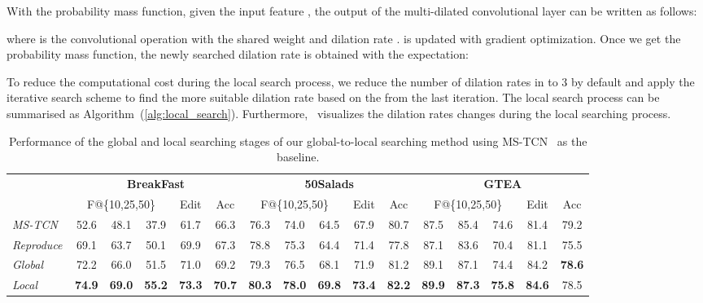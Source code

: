 \documentclass[final]{cvpr}
\renewcommand{\algref}[1]{Algorithm~(\ref{#1})}
\newcommand{\tbf}[1]{\textbf{#1}}
\begin{document}
With the probability mass function, given the input feature ,
the output  of the multi-dilated convolutional layer can be written 
as follows:

where  is the convolutional operation 
with the shared weight  and dilation rate .
 is updated with gradient optimization.
Once we get the probability mass function,
the newly searched dilation rate  is obtained with the expectation:

To reduce the computational cost during the local search process, 
we reduce the number of dilation rates in  to 3 by default
and apply the iterative search scheme to find the more suitable dilation rate 
based on the   from the last iteration.
The local search process can be summarised as \algref{alg:local_search}.
Furthermore,~ visualizes the dilation rates 
changes during the local searching process.

\def\fMeaures{\multicolumn{3}{c}{F@\{10,25,50\}}}

\begin{table*}[t]
  \small
  \centering 
  \setlength{\tabcolsep}{2.23mm}
  \begin{tabular}{lccccc|ccccc|ccccc}
    \toprule & \multicolumn{5}{c|}{\tbf{BreakFast}} &  
    \multicolumn{5}{c|}{\tbf{50Salads}} &
    \multicolumn{5}{c}{\tbf{GTEA}} 
    \\
    & \fMeaures & Edit & Acc & \fMeaures & Edit & Acc & \fMeaures & Edit & Acc
    \\ \Xhline{0.8pt}
    \textsl{MS-TCN~\cite{farha2019ms}}
    & 52.6 & 48.1 & 37.9 & 61.7 & 66.3
    & 76.3 & 74.0 & 64.5 & 67.9 & 80.7
    & 87.5 & 85.4 & 74.6 & 81.4 & 79.2
    \\
    \textsl{Reproduce}
    & 69.1 & 63.7 & 50.1 & 69.9 & 67.3
    & 78.8 & 75.3 & 64.4 & 71.4 & 77.8
    & 87.1 & 83.6 & 70.4 & 81.1 & 75.5
    \\ \hline
    \textsl{Global}
    & 72.2 & 66.0 & 51.5 & 71.0 & 69.2
    & 79.3 & 76.5 & 68.1 & 71.9 & 81.2
    & 89.1 & 87.1 & 74.4 & 84.2 & \tbf{78.6}
    \\
    \textsl{Local}
    & \tbf{74.9} & \tbf{69.0} & \tbf{55.2} & \tbf{73.3} & \tbf{70.7}
    & \tbf{80.3} & \tbf{78.0} & \tbf{69.8} & \tbf{73.4} & \tbf{82.2}
    & \tbf{89.9} & \tbf{87.3} & \tbf{75.8} & \tbf{84.6} & 78.5 \\
    \bottomrule
  \end{tabular}
  \vspace{4pt}
  \caption{Performance of the global and local searching stages of 
    our global-to-local 
    searching method using MS-TCN~\cite{farha2019ms} as the baseline.  
  }\label{tab:search}
\end{table*}
\end{document}
